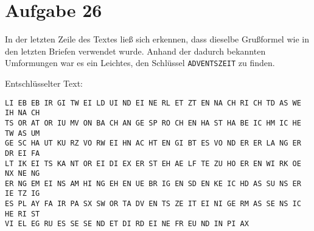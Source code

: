 \section*{Aufgabe 26}
In der letzten Zeile des Textes ließ sich erkennen, dass dieselbe Grußformel
wie in den letzten Briefen verwendet wurde. Anhand der dadurch bekannten
Umformungen war es ein Leichtes, den Schlüssel \verb/ADVENTSZEIT/ zu finden.

Entschlüsselter Text:
\begin{verbatim}
LI EB EB IR GI TW EI LD UI ND EI NE RL ET ZT EN NA CH RI CH TD AS WE IH NA CH
TS OR AT OR IU MV ON BA CH AN GE SP RO CH EN HA ST HA BE IC HM IC HE TW AS UM
GE SC HA UT KU RZ VO RW EI HN AC HT EN GI BT ES VO ND ER ER LA NG ER DR EI FA
LT IK EI TS KA NT OR EI DI EX ER ST EH AE LF TE ZU HO ER EN WI RK OE NX NE NG
ER NG EM EI NS AM HI NG EH EN UE BR IG EN SD EN KE IC HD AS SU NS ER IE TZ IG
ES PL AY FA IR PA SX SW OR TA DV EN TS ZE IT EI NI GE RM AS SE NS IC HE RI ST
VI EL EG RU ES SE SE ND ET DI RD EI NE FR EU ND IN PI AX 
\end{verbatim}

